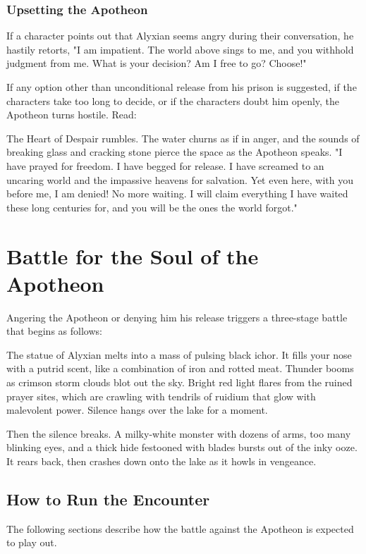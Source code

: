 \documentclass[10pt,a4paper,twoside,twocolumn,openany,nodeprecatedcode]{dndbook}
\begin{document}
\subsubsection{Upsetting the Apotheon}
If a character points out that Alyxian seems angry during their conversation, he hastily retorts, "I am impatient. The world above sings to me, and you withhold judgment from me. What is your decision? Am I free to go? Choose!"

If any option other than unconditional release from his prison is suggested, if the characters take too long to decide, or if the characters doubt him openly, the Apotheon turns hostile. Read:

\begin{DndReadAloud}{}
The Heart of Despair rumbles. The water churns as if in anger, and the sounds of breaking glass and cracking stone pierce the space as the Apotheon speaks. "I have prayed for freedom. I have begged for release. I have screamed to an uncaring world and the impassive heavens for salvation. Yet even here, with you before me, I am denied! No more waiting. I will claim everything I have waited these long centuries for, and you will be the ones the world forgot."

\end{DndReadAloud}

\section{Battle for the Soul of the Apotheon}
Angering the Apotheon or denying him his release triggers a three-stage battle that begins as follows:

\begin{DndReadAloud}{}
The statue of Alyxian melts into a mass of pulsing black ichor. It fills your nose with a putrid scent, like a combination of iron and rotted meat. Thunder booms as crimson storm clouds blot out the sky. Bright red light flares from the ruined prayer sites, which are crawling with tendrils of ruidium that glow with malevolent power. Silence hangs over the lake for a moment.

Then the silence breaks. A milky-white monster with dozens of arms, too many blinking eyes, and a thick hide festooned with blades bursts out of the inky ooze. It rears back, then crashes down onto the lake as it howls in vengeance.

\end{DndReadAloud}

\subsection{How to Run the Encounter}
The following sections describe how the battle against the Apotheon is expected to play out.
\end{document}
